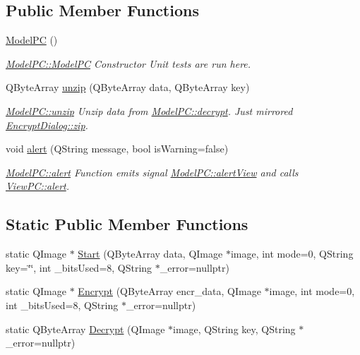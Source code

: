 \subsection*{Public Member Functions}
\begin{DoxyCompactItemize}
\item 
\hyperlink{class_model_p_c_ae12ebe65ec973c02a0de4850a7c1e31c}{Model\-P\-C} ()
\begin{DoxyCompactList}\small\item\em \hyperlink{class_model_p_c_ae12ebe65ec973c02a0de4850a7c1e31c}{Model\-P\-C\-::\-Model\-P\-C} Constructor Unit tests are run here. \end{DoxyCompactList}\item 
Q\-Byte\-Array \hyperlink{class_model_p_c_a6da88f166785a49f73b22c169f956fd0}{unzip} (Q\-Byte\-Array data, Q\-Byte\-Array key)
\begin{DoxyCompactList}\small\item\em \hyperlink{class_model_p_c_a6da88f166785a49f73b22c169f956fd0}{Model\-P\-C\-::unzip} Unzip data from \hyperlink{class_model_p_c_a9458c3a1e369a64889d9a1f70e0c1d18}{Model\-P\-C\-::decrypt}. Just mirrored \hyperlink{class_encrypt_dialog_a2bff820a3df4ddc36ecb07ed74b7138a}{Encrypt\-Dialog\-::zip}. \end{DoxyCompactList}\item 
void \hyperlink{class_model_p_c_a9079a101d83672aa48fd2dbac797de40}{alert} (Q\-String message, bool is\-Warning=false)
\begin{DoxyCompactList}\small\item\em \hyperlink{class_model_p_c_a9079a101d83672aa48fd2dbac797de40}{Model\-P\-C\-::alert} Function emits signal \hyperlink{class_model_p_c_af0217a7ca5671e26090dc50a5dccdaf5}{Model\-P\-C\-::alert\-View} and calls \hyperlink{class_view_p_c_a7c467169467789561078abc9d4fe57bd}{View\-P\-C\-::alert}. \end{DoxyCompactList}\end{DoxyCompactItemize}
\subsection*{Static Public Member Functions}
\begin{DoxyCompactItemize}
\item 
static Q\-Image $\ast$ \hyperlink{class_model_p_c_a77a3beaa87ab7d882215730c546a1c91}{Start} (Q\-Byte\-Array data, Q\-Image $\ast$image, int mode=0, Q\-String key=\char`\"{}\char`\"{}, int \-\_\-bits\-Used=8, Q\-String $\ast$\-\_\-error=nullptr)
\item 
static Q\-Image $\ast$ \hyperlink{class_model_p_c_a132a399bf401a97106c2368e6e9e8792}{Encrypt} (Q\-Byte\-Array encr\-\_\-data, Q\-Image $\ast$image, int mode=0, int \-\_\-bits\-Used=8, Q\-String $\ast$\-\_\-error=nullptr)
\item 
static Q\-Byte\-Array \hyperlink{class_model_p_c_ac245b9b6d618f421c0ccfa66d97ac905}{Decrypt} (Q\-Image $\ast$image, Q\-String key, Q\-String $\ast$\-\_\-error=nullptr)
\end{DoxyCompactItemize}

